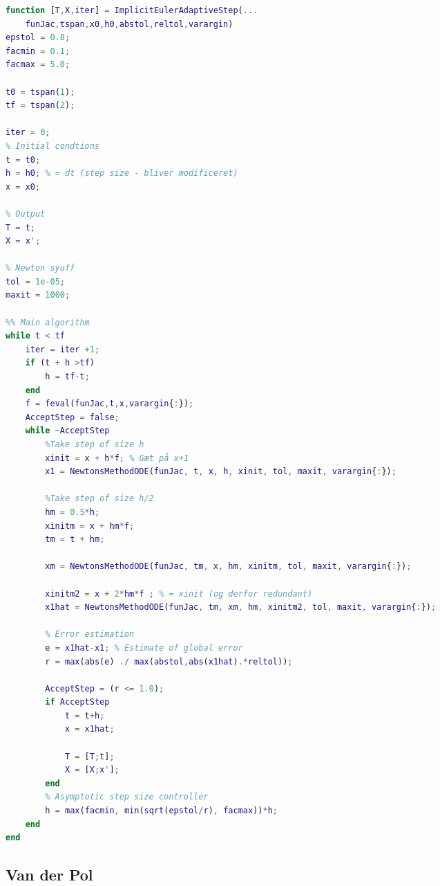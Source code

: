 \begin{adjustwidth*}{0cm}{-0.4cm}
\begin{lstlisting}[frame=single, language=Matlab,caption=Implicit Euler (adaptive step size), label=ExplicitEulerFixie]
function [T,X,iter] = ImplicitEulerAdaptiveStep(...
    funJac,tspan,x0,h0,abstol,reltol,varargin)
epstol = 0.8;
facmin = 0.1;
facmax = 5.0;

t0 = tspan(1);
tf = tspan(2);

iter = 0;
% Initial condtions
t = t0;
h = h0; % = dt (step size - bliver modificeret)
x = x0;

% Output
T = t;
X = x';

% Newton syuff
tol = 1e-05;
maxit = 1000;

%% Main algorithm
while t < tf
    iter = iter +1;
    if (t + h >tf)
        h = tf-t;
    end
    f = feval(funJac,t,x,varargin{:});
    AcceptStep = false;
    while ~AcceptStep
        %Take step of size h
        xinit = x + h*f; % Gæt på x+1
        x1 = NewtonsMethodODE(funJac, t, x, h, xinit, tol, maxit, varargin{:});

        %Take step of size h/2
        hm = 0.5*h;
        xinitm = x + hm*f;
        tm = t + hm;

        xm = NewtonsMethodODE(funJac, tm, x, hm, xinitm, tol, maxit, varargin{:});
        
        xinitm2 = x + 2*hm*f ; % = xinit (og derfor redundant)
        x1hat = NewtonsMethodODE(funJac, tm, xm, hm, xinitm2, tol, maxit, varargin{:});

        % Error estimation
        e = x1hat-x1; % Estimate of global error
        r = max(abs(e) ./ max(abstol,abs(x1hat).*reltol));

        AcceptStep = (r <= 1.0);
        if AcceptStep
            t = t+h;
            x = x1hat;

            T = [T;t];
            X = [X;x'];
        end
        % Asymptotic step size controller
        h = max(facmin, min(sqrt(epstol/r), facmax))*h;
    end
end
\end{lstlisting}
\end{adjustwidth*}










\subsection{Van der Pol}